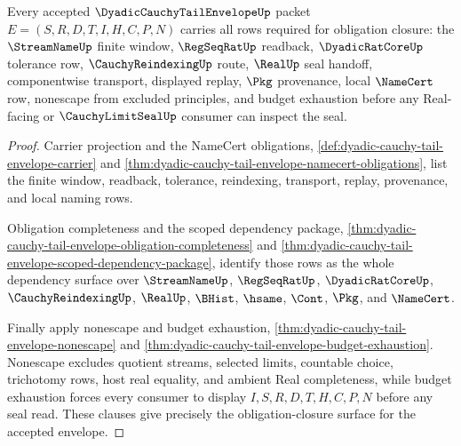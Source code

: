 \begin{theorem}\label{thm:dyadic-cauchy-tail-envelope-obligation-closure}
Every accepted $\DyadicCauchyTailEnvelopeUp$ packet $E=(S,R,D,T,I,H,C,P,N)$ carries all rows required for obligation closure: the $\StreamNameUp$ finite window, $\RegSeqRatUp$ readback, $\DyadicRatCoreUp$ tolerance row, $\CauchyReindexingUp$ route, $\RealUp$ seal handoff, componentwise transport, displayed replay, $\Pkg$ provenance, local $\NameCert$ row, nonescape from excluded principles, and budget exhaustion before any Real-facing or $\CauchyLimitSealUp$ consumer can inspect the seal.
\end{theorem}
\begin{proof}
Carrier projection and the NameCert obligations, \autoref{def:dyadic-cauchy-tail-envelope-carrier} and \autoref{thm:dyadic-cauchy-tail-envelope-namecert-obligations}, list the finite window, readback, tolerance, reindexing, transport, replay, provenance, and local naming rows.

Obligation completeness and the scoped dependency package, \autoref{thm:dyadic-cauchy-tail-envelope-obligation-completeness} and \autoref{thm:dyadic-cauchy-tail-envelope-scoped-dependency-package}, identify those rows as the whole dependency surface over $\StreamNameUp$, $\RegSeqRatUp$, $\DyadicRatCoreUp$, $\CauchyReindexingUp$, $\RealUp$, $\BHist$, $\hsame$, $\Cont$, $\Pkg$, and $\NameCert$.

Finally apply nonescape and budget exhaustion, \autoref{thm:dyadic-cauchy-tail-envelope-nonescape} and \autoref{thm:dyadic-cauchy-tail-envelope-budget-exhaustion}. Nonescape excludes quotient streams, selected limits, countable choice, trichotomy rows, host real equality, and ambient Real completeness, while budget exhaustion forces every consumer to display $I,S,R,D,T,H,C,P,N$ before any seal read. These clauses give precisely the obligation-closure surface for the accepted envelope.
\end{proof}

